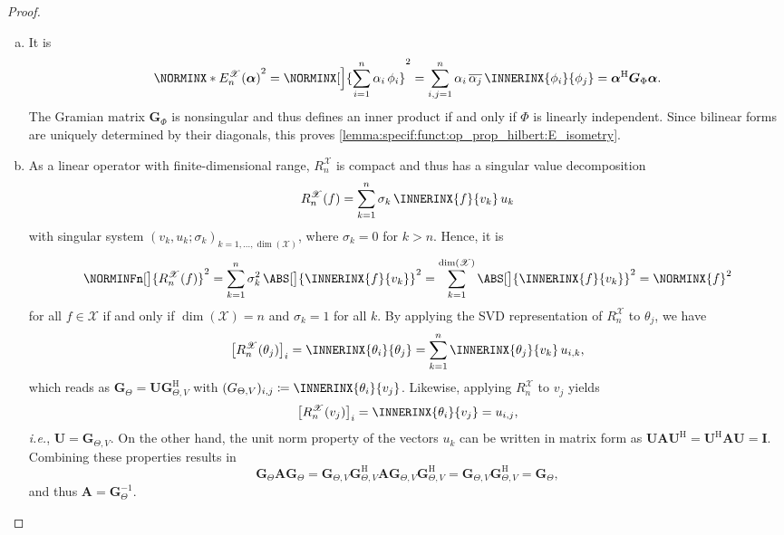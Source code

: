 \documentclass[a4paper]{paper}
\newcommand*{\SPC}[1]{{\ensuremath{\mathscr{#1}}}}
\newcommand*{\SPCX}{\SPC{X}}
\newcommand*{\EXT}[2]{\ensuremath{E_{#1}^{#2}}}
\newcommand*{\REST}[2]{\ensuremath{R_{#1}^{#2}}}
\newcommand*{\RnX}{{\ensuremath{\REST{n}{\SPC{X}}}}}
\newcommand*{\EnX}{{\ensuremath{\EXT{n}{\SPC{X}}}}}
\DeclareMathOperator{\DIM}{dim}
\newcommand*{\HERM}[1]{{\ensuremath{#1^{\mathrm{H}}}}}
\newcommand{\ie}{\textsl{i.e.}\xspace}
\newcommand{\valpha}{\boldsymbol{\alpha}}
\newcommand{\vA}{\boldsymbol{A}}
\newcommand{\vG}{\boldsymbol{G}}
\newcommand{\vI}{\boldsymbol{I}}
\newcommand{\vU}{\boldsymbol{U}}
\begin{document}
\begin{proof}
\begin{enumerate}[(a)]
  \item It is
  \begin{equation*}
   \NORMINX*{\EnX(\valpha)}^2 = \NORMINX[\Big]{\sum_{i=1}^n \alpha_i\, \phi_i}^2 = 
   \sum_{i,j=1}^n \alpha_i\, \overline{\alpha_j}\, \INNERINX{\phi_i}{\phi_j} = \HERM{\valpha} \vG_\Phi \valpha.
  \end{equation*}
  The Gramian matrix $\vG_\Phi$ is nonsingular and thus defines an inner product if and only if $\Phi$ is linearly 
  independent. Since bilinear forms are uniquely determined by their diagonals, this proves 
  \eqref{lemma:specif:funct:op_prop_hilbert:E_isometry}.
  
  \item As a linear operator with finite-dimensional range, $\RnX$ is compact and thus has a singular value 
  decomposition
  \begin{equation*}
   \RnX(f) = \sum_{k=1}^n \sigma_k\, \INNERINX{f}{v_k}\, u_k
  \end{equation*}
  with singular system $(v_k, u_k; \sigma_k)_{k=1, \dotsc, \DIM(\SPCX)}$, where $\sigma_k = 0$ for $k > n$. Hence, it 
  is
  \begin{equation*}
   \NORMINFn[\big]{\RnX(f)}^2 = \sum_{k=1}^n \sigma_k^2\, \ABS[\big]{\INNERINX{f}{v_k}}^2 
   = \sum_{k=1}^{\DIM(\SPCX)} \ABS[\big]{\INNERINX{f}{v_k}}^2 = \NORMINX{f}^2
  \end{equation*}
  for all $f\in\SPCX$ if and only if $\DIM(\SPCX) = n$ and $\sigma_k = 1$ for all $k$. By applying the SVD
  representation of $\RnX$ to $\theta_j$, we have
  \begin{equation*}
   \big[ \RnX(\theta_j) \big]_i = \INNERINX{\theta_i}{\theta_j} = \sum_{k=1}^n \INNERINX{\theta_j}{v_k}\, 
   u_{i,k},
  \end{equation*}
  which reads as $\vG_\Theta = \vU \HERM{\vG_{\Theta,V}}$ with 
  $(G_{\Theta,V})_{i,j} \coloneqq  \INNERINX{\theta_i}{v_j}$. Likewise, applying $\RnX$ to $v_j$ yields
  \begin{equation*}
   \big[ \RnX(v_j) \big]_i = \INNERINX{\theta_i}{v_j} = u_{i,j},
  \end{equation*}
  \ie, $\vU = \vG_{\Theta,V}$. On the other hand, the unit norm property of the vectors $u_k$ can be written in matrix 
  form as $\vU \vA \HERM{\vU} = \HERM{\vU} \vA \vU = \vI$. Combining these properties results in
  \begin{equation*}
   \vG_\Theta \vA \vG_\Theta = \vG_{\Theta,V} \HERM{\vG_{\Theta,V}} \vA \vG_{\Theta,V} \HERM{\vG_{\Theta,V}}
   = \vG_{\Theta,V} \HERM{\vG_{\Theta,V}} = \vG_\Theta,
  \end{equation*}
  and thus $\vA = \vG_\Theta^{-1}$.
 \end{enumerate}
\end{proof}
\end{document}

